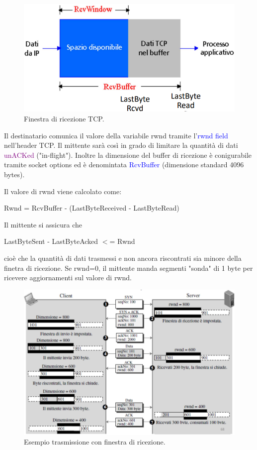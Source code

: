\begin{figure}[h]
    \centering
    \includegraphics[scale=0.35]{Immagini/FinestraDiRicezioneTCP.png}
    \caption{Finestra di ricezione TCP.}
\end{figure}

Il destinatario comunica il valore della variabile rwnd tramite l'\textcolor{blue}{rwnd field} nell'header TCP. 
Il mittente sarà così in grado di limitare la quantità di dati \textcolor{purple}{unACKed} ("in-flight").
Inoltre la dimensione del buffer di ricezione è conigurabile tramite socket options ed è denomintata \textcolor{blue}{RcvBuffer} (dimensione standard 4096 bytes).

Il valore di rwnd viene calcolato come:
\begin{center}
    Rwnd = RcvBuffer - (LastByteReceived - LastByteRead)
\end{center}
Il mittente si assicura che
\begin{center}
    LastByteSent - LastByteAcked $<$= Rwnd
\end{center}
cioè che la quantità di dati trasmessi e non ancora riscontrati sia minore della finetra di ricezione.
Se rwnd=0, il mittente manda segmenti "sonda" di 1 byte per ricevere aggiornamenti sul valore di rwnd.

\begin{figure}[h]
    \centering
    \includegraphics[scale=0.45]{Immagini/TCPEsempioTrasmissioneFinestraDiRicezione.png}
    \caption{Esempio trasmissione con finestra di ricezione.}
\end{figure}

